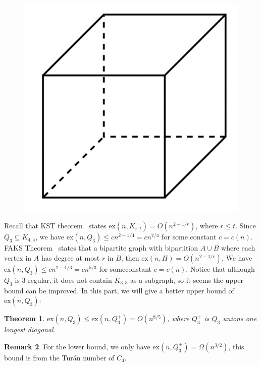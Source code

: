 \documentclass{article}
\newtheorem{theorem}{Theorem}[section]
\theoremstyle{definition}
\newtheorem{remark}[theorem]{Remark}
\newcommand{\ex}{\mathrm{ex}}
\def\Turan{Tur\'an}
\begin{document}
\begin{figure}[h]
     \centering
     \includegraphics[scale=0.6]{11-1.png}
\end{figure}

Recall that KST theorem~\cite{kHovari1954problem} states $\ex(n,K_{r,t})=O(n^{2-1/r})$, where $r\leq t$. Since $Q_{3}\subseteq K_{4,4}$, we have $\ex(n,Q_{3})\leq cn^{2-1/4}=cn^{7/4}$ for some constant $c=c(n)$. FAKS Theorem~\cite{Furedi1991,Alon2003} states that a bipartite graph with bipartition $A\cup B$ where each vertex in $A$ has degree at most $r$ in $B$, then $\ex(n,H)=O(n^{2-1/r})$. We have $\ex(n,Q_{3})\leq cn^{2-1/3}=cn^{5/3}$ for someconstant $c=c(n)$. Notice that although $Q_{3}$ is 3-regular, it does not contain $K_{3,3}$ as a subgraph, so it seems the upper bound can be improved. In this part, we will give a better upper bound of $\ex(n,Q_{3})$:

\begin{theorem}
    $\ex(n,Q_{3})\leq\ex(n,Q_{3}^{+})=O(n^{8/5})$, where $Q_{3}^{+}$ is $Q_{3}$ unions one longest diagonal.
\end{theorem}

\begin{remark}
    For the lower bound, we only have $\ex(n,Q_{3}^{+})=\Omega(n^{3/2})$, this bound is from the \Turan{} number of $C_{4}$.
\end{remark}
\end{document}
